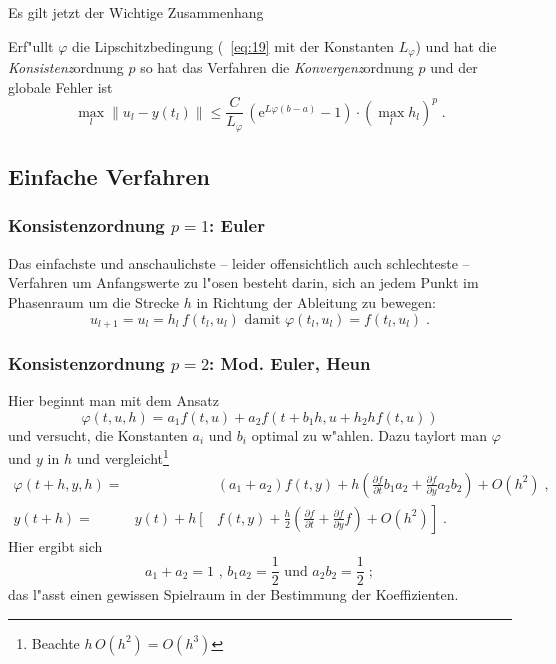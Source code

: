 \documentclass[a4paper]{book}
\newcommand{\E}{\ensuremath{\mathrm e}}
\begin{document}
Es gilt jetzt der Wichtige Zusammenhang
\begin{Wichtig}
  Erf"ullt $\varphi$ die Lipschitzbedingung (~\eqref{eq:19} mit der
  Konstanten $L_\varphi$) und hat die \emph{Konsistenz}ordnung $p$ so
  hat das Verfahren die \emph{Konvergenz}ordnung $p$ und der globale
  Fehler ist
  \begin{equation}
    \label{eq:69}
    \max_l \| u_l - y(t_l) \| \leq \frac{C}{L_\varphi} \, \left (
      \E^{L\varphi(b-a)}-1 \right ) \cdot \left ( \max_l h_l \right )^p \;.
  \end{equation}
\end{Wichtig}






\subsection{Einfache Verfahren}
\label{sec:einfache_verfahren}

\subsubsection{Konsistenzordnung $p = 1$: Euler}
\label{sec:konsistenzordnung_p_=_1:_euler}

Das einfachste und anschaulichste -- leider offensichtlich auch
schlechteste -- Verfahren um Anfangswerte zu l"osen besteht darin,
sich an jedem Punkt im Phasenraum um die Strecke $h$ in Richtung der
Ableitung zu bewegen:
\begin{equation}
  \label{eq:euler}
  u_{l+1} = u_l = h_l \, f( t_l , u_l ) \text{ damit } \varphi(t_l,
  u_l) = f(t_l, u_l) \;.
\end{equation}



\subsubsection{Konsistenzordnung $p=2$: Mod. Euler, Heun}
\label{sec:kons_p=2:_mod._euler_heun}

Hier beginnt man mit dem Ansatz
\begin{equation}
  \label{eq:71}
  \varphi(t,u,h) = a_1 f(t,u) + a_2f(t+b_1 h, u+h_2 h f(t,u) )
\end{equation}
und versucht, die Konstanten $a_i$ und $b_i$ optimal zu w"ahlen. Dazu
taylort man $\varphi$ und $y$ in $h$ und vergleicht\footnote{Beachte
  $h \, O(h^2) = O(h^3)$}
\begin{align*}
  \varphi(t+h,y,h) =& &(a_1 + a_2) f(t,y) + h\left ( \frac{\partial
      f}{\partial t} b_1 a_2 + \frac{\partial f}{\partial y} a_2 b_2
  \right ) + O(h^2) \;,\\
  y(t+h) =& y(t) + h \left[ \right . & f(t,y) + \frac{h}{2} \left ( \frac{\partial
      f}{\partial t} + \frac{\partial f}{\partial y}f \right )  +
  O(h^2) \left . \right] \;.
\end{align*}
Hier ergibt sich
\begin{equation*}
  a_1+a_2 = 1 \text{ , } b_1 a_2 = \frac{1}{2} \text{ und } a_2 b_2 =
  \frac{1}{2} \;;
\end{equation*}
das l"asst einen gewissen Spielraum in der Bestimmung der
Koeffizienten.
\end{document}
